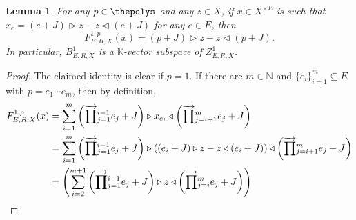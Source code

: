 \documentclass[10pt,a4paper]{amsart}
\numberwithin{equation}{section}
\newtheorem{Lemma}[Theorem]{Lemma}
\newcommand{\HSuacocycles}[4]{Z^{#1}_{#2,#3,#4}}
\newcommand{\HSuacoboundaries}[4]{B^{#1}_{#2,#3,#4}}
\newcommand{\HSuafuncxx}[6]{F^{#1,#5}_{#2,#3,#4}(#6)}
\newcommand{\pint}{\mathbb{N}}
\newcommand{\Sdirectproduct}{\times}
\newcommand{\Sleftmoduleaction}{\triangleright}
\newcommand{\Srightmoduleaction}{\triangleleft}
\newcommand{\tsrightwardproduct}[2]{{\overrightarrow{ \prod}}\vphantom{ \prod}_{#1}^{#2}}
\newcommand{\thegens}{E}
\newcommand{\therels}{R}
\newcommand{\theideal}{J}
\newcommand{\thefield}{\mathbb{K}}
\newcommand{\themodule}{X}
\begin{document}
{{
  \begin{Lemma}
    \label{lemma:hochschild-particular-one-cohomology-well-defined}
        {
        \newcommand{\thevector}{z}
        \newcommand{\somepoly}{p}
        \newcommand{\somegen}{e}
        \newcommand{\thetuple}{x}
        \newcommand{\thetuplex}[1]{\thetuple_{#1}}
        For any $\somepoly\in\thepolys$ and any $\thevector\in \themodule$, if $\thetuple\in \themodule^{\Sdirectproduct \thegens}$ is such that $\thetuplex{\somegen}=(\somegen+\theideal)\Sleftmoduleaction\thevector-\thevector\Srightmoduleaction(\somegen+\theideal)$ for any $\somegen\in\thegens$, then
        \[
          \HSuafuncxx{1}{\thegens}{\therels}{\themodule}{\somepoly}{\thetuple}=(\somepoly+\theideal)\Sleftmoduleaction\thevector-\thevector\Srightmoduleaction(\somepoly+\theideal).
        \]
        In particular, $\HSuacoboundaries{1}{\thegens}{\therels}{\themodule}$ is a $\thefield$-vector subspace of $\HSuacocycles{1}{\thegens}{\therels}{\themodule}$.
          }
  \end{Lemma}
  \begin{proof}
      {
      \newcommand{\thee}[1]{e_{#1}}
      \newcommand{\indi}{i}
      \newcommand{\indj}{j}
      \newcommand{\somenumber}{m}
              \newcommand{\thevector}{z}
        \newcommand{\somepoly}{p}
        \newcommand{\somegen}{e}
        \newcommand{\thetuple}{x}
        \newcommand{\anyvector}{w}
        \newcommand{\anyrel}{r}
        \newcommand{\thetuplex}[1]{\thetuple_{#1}}
      The claimed identity is clear if $\somepoly=1$. If there are  $\somenumber\in\pint$ and $\{\thee{\indi}\}_{\indi=1}^{\somenumber}\subseteq \thegens$ with $p=e_1\cdots e_m$, then by definition,
          \begin{align*}     \HSuafuncxx{1}{\thegens}{\therels}{\themodule}{\somepoly}{\thetuple}&{}= \sum_{\indi=1}^\somenumber \left(\tsrightwardproduct{\indj=1}{\indi-1}{\thee{\indj}+\theideal}\right)\Sleftmoduleaction\thetuplex{\thee{\indi}}\Srightmoduleaction\left(\tsrightwardproduct{\indj=\indi+1}{\somenumber}{\thee{\indj}+\theideal}\right)\\
      &{}= \sum_{\indi=1}^\somenumber \left(\tsrightwardproduct{\indj=1}{\indi-1}{\thee{\indj}+\theideal}\right)\Sleftmoduleaction((\thee{\indi}+\theideal)\Sleftmoduleaction\thevector-\thevector\Srightmoduleaction(\thee{\indi}+\theideal))\Srightmoduleaction\left(\tsrightwardproduct{\indj=\indi+1}{\somenumber}{\thee{\indj}+\theideal}\right)\\
      &{}= \left(\sum_{\indi=2}^{\somenumber+1} \left(\tsrightwardproduct{\indj=1}{\indi-1}{\thee{\indj}+\theideal}\right)\Sleftmoduleaction\thevector\Srightmoduleaction\left(\tsrightwardproduct{\indj=\indi}{\somenumber}{\thee{\indj}+\theideal}\right)\right)\\

\end{align*}}
\end{proof}}}
\end{document}
